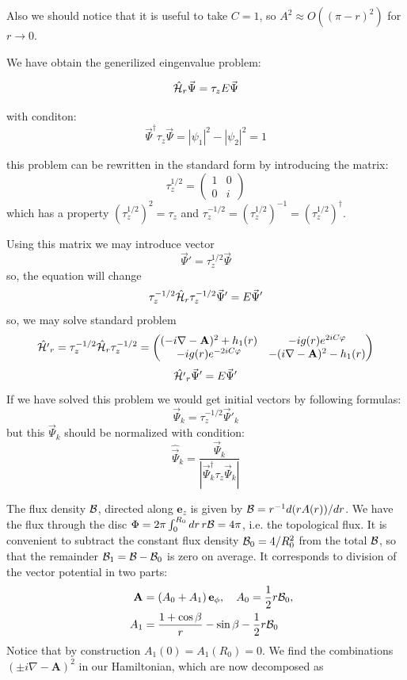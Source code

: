 \documentclass[a4paper,article,14pt]{extarticle}
\begin{document}
Also we should notice that it is useful to take $C=1$, so $A^2 \approx O((\pi - r)^2)$ for $r\rightarrow 0$.

We have obtain the generilized eingenvalue problem:

$$
\hat {\cal H}_{r} \vec{\Psi} = \tau_z E \vec{\Psi}
$$

with conditon:
$$
\vec{\Psi}^\dagger \tau_z \vec{\Psi} =|\psi_1|^2-|\psi_2|^2=1
$$

this problem can be rewritten in the standard form by introducing the matrix: 
$$
\tau_z^{1/2} = 
	\begin{pmatrix} 	
		1 &  0 \\
		0 &  i 
	\end{pmatrix}
$$
which has a property $(\tau_z^{1/2})^2 = \tau_z$ and $\tau_z^{-1/2}=(\tau_z^{1/2})^{-1}=(\tau_z^{1/2})^\dagger$.

Using this matrix we may introduce vector 
$$
\vec{\Psi}'=\tau_z^{1/2} \vec{\Psi}
$$
so, the equation will change
$$
\tau_z^{-1/2} \hat {\cal H}_{r} \tau_z^{-1/2} \vec{\Psi}' = E \vec{\Psi}'
$$
so, we may solve standard problem
$$
\hat {\cal H'}_{r} = \tau_z^{-1/2} \hat {\cal H}_{r} \tau_z^{-1/2} = \begin{pmatrix} 
(- i \nabla - \mathbf{A} ) ^ 2 + h_1 (r) &  -i g (r) e^{2 i C \varphi} \\  
-i g (r) e^{-2 i C \varphi}   & - ( i \nabla - \mathbf{A} ) ^ 2 - h_1 (r) 
\end{pmatrix}
$$
$$
\hat {\cal H'}_{r} \vec{\Psi}' = E \vec{\Psi}'
$$
If we have solved this problem we would get initial vectors by following formulas:
$$
\vec{\Psi}_{k} = \tau_z^{-1/2} \vec{\Psi}'_{k}
$$
but this $\vec{\Psi}_k$ should be normalized with condition:
$$
\hat{\vec{\Psi}}_{k} = \frac{\vec{\Psi}_{k}}{|\vec{\Psi}_{k}^\dagger \tau_z \vec{\Psi}_{k}|}
$$

The flux density $\cal B$, directed along $\mathbf{e}_z$  is given by   ${\cal B} = r^{-1} d(r A(r))/dr$. 
We have the flux through the disc $ \Phi = 2\pi \int _{0}^{R_{0}} dr\, r {\cal B} = 4\pi $, i.e. the topological flux.  It 
is convenient to subtract the constant flux density ${\cal B}_{0} = 4/R_{0}^{2}$ from the total $\cal B$, so that the remainder ${\cal B}_{1} = {\cal B} - {\cal B}_{0}$ is zero on average. 
It corresponds to division of the vector potential in two parts:
\begin{equation}
\begin{aligned}
\mathbf{A}  & = \left(A_0 + A_1  \right) \mathbf{e}_\phi, \quad A_0 =   \frac 1 2 r {\cal B}_{0} ,    \\
\quad A_1 & = \frac{1+  \cos\beta } { r } - \sin \beta - \frac 1 2 r {\cal B}_{0}     \\
\end{aligned}
\label{}
\end{equation}
Notice that by construction $A_{1}(0) = A_{1}(R_{0}) = 0 $.  We find the combinations $(\pm i \nabla - \mathbf{A} ) ^ 2$ in our Hamiltonian, which are now decomposed as
\end{document}
